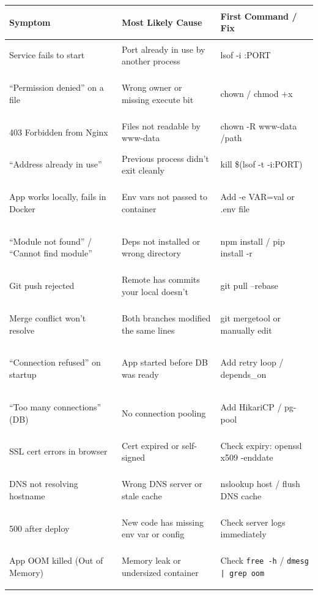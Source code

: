 \documentclass[11pt, letterpaper]{article}
\begin{document}
\noindent
{\small\renewcommand{\arraystretch}{1.6}
\begin{tabularx}{\textwidth}{>{\bfseries\raggedright\arraybackslash}p{4.2cm}
                              >{\raggedright\arraybackslash}X
                              >{\ttfamily\raggedright\arraybackslash}p{4.5cm}}
\toprule
\rowcolor{tableheaderred}
\textbf{Symptom} & \textbf{Most Likely Cause} & \textbf{First Command / Fix} \\
\midrule
\rowcolor{rowRe} Service fails to start & Port already in use by another process & lsof -i :PORT \\
\rowcolor{rowA}  ``Permission denied'' on a file & Wrong owner or missing execute bit & chown / chmod +x \\
\rowcolor{rowRe} 403 Forbidden from Nginx & Files not readable by www-data & chown -R www-data /path \\
\rowcolor{rowA}  ``Address already in use'' & Previous process didn't exit cleanly & kill \$(lsof -t -i:PORT) \\
\rowcolor{rowRe} App works locally, fails in Docker & Env vars not passed to container & Add -e VAR=val or .env file \\
\rowcolor{rowA}  ``Module not found'' / ``Cannot find module'' & Deps not installed or wrong directory & npm install / pip install -r \\
\rowcolor{rowRe} Git push rejected & Remote has commits your local doesn't & git pull --rebase \\
\rowcolor{rowA}  Merge conflict won't resolve & Both branches modified the same lines & git mergetool or manually edit \\
\rowcolor{rowRe} ``Connection refused'' on startup & App started before DB was ready & Add retry loop / depends\_on \\
\rowcolor{rowA}  ``Too many connections'' (DB) & No connection pooling & Add HikariCP / pg-pool \\
\rowcolor{rowRe} SSL cert errors in browser & Cert expired or self-signed & Check expiry: openssl x509 -enddate \\
\rowcolor{rowA}  DNS not resolving hostname & Wrong DNS server or stale cache & nslookup host / flush DNS cache \\
\rowcolor{rowRe} 500 after deploy & New code has missing env var or config & Check server logs immediately \\
\rowcolor{rowA}  App OOM killed (Out of Memory) & Memory leak or undersized container & Check \texttt{free -h} / \texttt{dmesg | grep oom} \\

\end{tabularx}}
\end{document}
